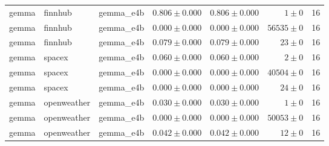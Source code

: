 \begin{table}[htbp]
\begin{tabular}{l l l r r r r}
gemma & finnhub & gemma\_e4b & $0.806\pm0.000$ & $0.806\pm0.000$ & $1\pm0$ & 16 \\
gemma & finnhub & gemma\_e4b & $0.000\pm0.000$ & $0.000\pm0.000$ & $56535\pm0$ & 16 \\
gemma & finnhub & gemma\_e4b & $0.079\pm0.000$ & $0.079\pm0.000$ & $23\pm0$ & 16 \\
gemma & spacex & gemma\_e4b & $0.060\pm0.000$ & $0.060\pm0.000$ & $2\pm0$ & 16 \\
gemma & spacex & gemma\_e4b & $0.000\pm0.000$ & $0.000\pm0.000$ & $40504\pm0$ & 16 \\
gemma & spacex & gemma\_e4b & $0.000\pm0.000$ & $0.000\pm0.000$ & $24\pm0$ & 16 \\
gemma & openweather & gemma\_e4b & $0.030\pm0.000$ & $0.030\pm0.000$ & $1\pm0$ & 16 \\
gemma & openweather & gemma\_e4b & $0.000\pm0.000$ & $0.000\pm0.000$ & $50053\pm0$ & 16 \\
gemma & openweather & gemma\_e4b & $0.042\pm0.000$ & $0.042\pm0.000$ & $12\pm0$ & 16 \\
\hline
\end{tabular}
\end{table}
